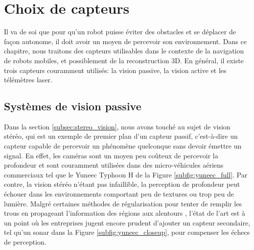 \section{Choix de capteurs}\label{sec:capteurs}

Il va de soi que pour qu'un robot puisse éviter des obstacles et se déplacer de façon autonome, il doit avoir un moyen de percevoir son environnement. Dans ce chapitre, nous traitons des capteurs utilisables dans le contexte de la navigation de robots mobiles, et possiblement de la reconstruction 3D. En général, il existe trois capteurs couramment utilisés: la vision passive, la vision active et les télémètres laser.

\subsection{Systèmes de vision passive}

Dans la section \ref{subsec:stereo_vision}, nous avons touché au sujet de vision stéréo, qui est un exemple de premier plan d'un capteur passif, c'est-à-dire un capteur capable de percevoir un phénomène quelconque sans devoir émettre un signal. En effet, les caméras sont un moyen peu coûteux de percevoir la profondeur et sont couramment utilisées dans des micro-véhicules aériens commerciaux tel que le Yuneec Typhoon H de la Figure \ref{subfig:yuneec_full}. Par contre, la vision stéréo n'étant pas infaillible, la perception de profondeur peut échouer dans les environnements comportant peu de textures ou trop peu de lumière. Malgré certaines méthodes de régularisation pour tenter de remplir les trous en propageant l'information des régions aux alentours \citep{Hirschmuller2008}, l'état de l'art est à un point où les entreprises jugent encore prudent d'ajouter un capteur secondaire, tel qu'un sonar dans la Figure \ref{subfig:yuneec_closeup}, pour compenser les échecs de perception.

